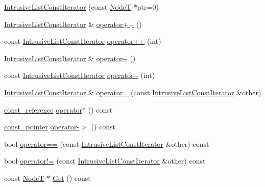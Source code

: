\begin{DoxyCompactItemize}
\item 
\hyperlink{class_fbx_intrusive_list_1_1_intrusive_list_const_iterator_a1d488b117949a719831d28c8bef98386}{Intrusive\+List\+Const\+Iterator} (const \hyperlink{class_fbx_intrusive_list_a6ffda382a6d029a042cbb0110853680c}{NodeT} $\ast$ptr=0)
\item 
\hyperlink{class_fbx_intrusive_list_1_1_intrusive_list_const_iterator}{Intrusive\+List\+Const\+Iterator} \& \hyperlink{class_fbx_intrusive_list_1_1_intrusive_list_const_iterator_acec5cc7484c22f7c9a75c98f1281397d}{operator++} ()
\item 
const \hyperlink{class_fbx_intrusive_list_1_1_intrusive_list_const_iterator}{Intrusive\+List\+Const\+Iterator} \hyperlink{class_fbx_intrusive_list_1_1_intrusive_list_const_iterator_a7bdf0ed9c35fae73e3998a09a209cf39}{operator++} (int)
\item 
\hyperlink{class_fbx_intrusive_list_1_1_intrusive_list_const_iterator}{Intrusive\+List\+Const\+Iterator} \& \hyperlink{class_fbx_intrusive_list_1_1_intrusive_list_const_iterator_a38f1d1a87aafa5d208c5dbf3158bb26d}{operator-\/-\/} ()
\item 
const \hyperlink{class_fbx_intrusive_list_1_1_intrusive_list_const_iterator}{Intrusive\+List\+Const\+Iterator} \hyperlink{class_fbx_intrusive_list_1_1_intrusive_list_const_iterator_a6db71090bf31cdb269e9e8d0c8e3b30c}{operator-\/-\/} (int)
\item 
\hyperlink{class_fbx_intrusive_list_1_1_intrusive_list_const_iterator}{Intrusive\+List\+Const\+Iterator} \& \hyperlink{class_fbx_intrusive_list_1_1_intrusive_list_const_iterator_af7448cbf7d925b7fabc3271340cc3c91}{operator=} (const \hyperlink{class_fbx_intrusive_list_1_1_intrusive_list_const_iterator}{Intrusive\+List\+Const\+Iterator} \&other)
\item 
\hyperlink{class_fbx_intrusive_list_a21904cb72c0ccae9d5c0b9f171befeb8}{const\+\_\+reference} \hyperlink{class_fbx_intrusive_list_1_1_intrusive_list_const_iterator_a32db6e7ef6d2f4404db030a0388fd4c9}{operator$\ast$} () const
\item 
\hyperlink{class_fbx_intrusive_list_ae8232fd6a6ef678e5d5eed6ad978994c}{const\+\_\+pointer} \hyperlink{class_fbx_intrusive_list_1_1_intrusive_list_const_iterator_aab8544db3196fab85a8f7b8198fe7c81}{operator-\/$>$} () const
\item 
bool \hyperlink{class_fbx_intrusive_list_1_1_intrusive_list_const_iterator_a6ad4323602ccebcd92b8df201ccf8c0a}{operator==} (const \hyperlink{class_fbx_intrusive_list_1_1_intrusive_list_const_iterator}{Intrusive\+List\+Const\+Iterator} \&other) const
\item 
bool \hyperlink{class_fbx_intrusive_list_1_1_intrusive_list_const_iterator_ab924df909170812a2c12dcee743e7c87}{operator!=} (const \hyperlink{class_fbx_intrusive_list_1_1_intrusive_list_const_iterator}{Intrusive\+List\+Const\+Iterator} \&other) const
\item 
const \hyperlink{class_fbx_intrusive_list_a6ffda382a6d029a042cbb0110853680c}{NodeT} $\ast$ \hyperlink{class_fbx_intrusive_list_1_1_intrusive_list_const_iterator_a186a7c02a4957551c0abd46fc77146ab}{Get} () const
\end{DoxyCompactItemize}


